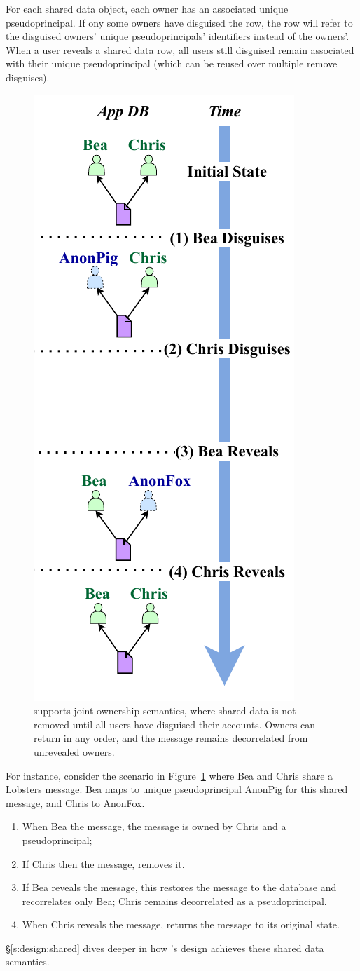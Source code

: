 %
For each shared data object, each owner has an associated unique
pseudoprincipal. If ony some owners have disguised the row, the row will refer
to the disguised owners' unique pseudoprincipals' identifiers instead of the
owners'.
%
When a user reveals a shared data row, all users still disguised remain 
associated with their unique pseudoprincipal (which can be reused over
multiple remove disguises).
%

\begin{figure}
    \centering
    \includegraphics[width=.4\textwidth]{figs/shared_hl}
    \caption[\sys supports joint ownership semantics when disguising shared data.]{\sys supports joint ownership semantics, where shared data is not
    removed until all users have disguised their accounts. Owners can return in
    any order, and the message remains decorrelated from unrevealed owners.}
\label{f:shared:hl}
\end{figure}

%
For instance, consider the scenario in Figure~\ref{f:shared:hl} where Bea and
Chris share a Lobsters message. Bea maps to unique pseudoprincipal AnonPig for this
shared message, and Chris to AnonFox.
\begin{enumerate}[nosep]
    \item[(1)] When Bea \xxs the message, the message is owned by
Chris and a pseudoprincipal;
    \item[(2)] If Chris then \xxs the message, \sys removes it.
    \item[(3)] If Bea reveals the message, this restores the message to the database
and recorrelates only Bea; Chris remains decorrelated as a pseudoprincipal.
\item[(4)] When Chris reveals the message, \sys returns
the message to its original state.
\end{enumerate}
%
\S\ref{s:design:shared} dives deeper in how \sys's design achieves these shared
data semantics.


